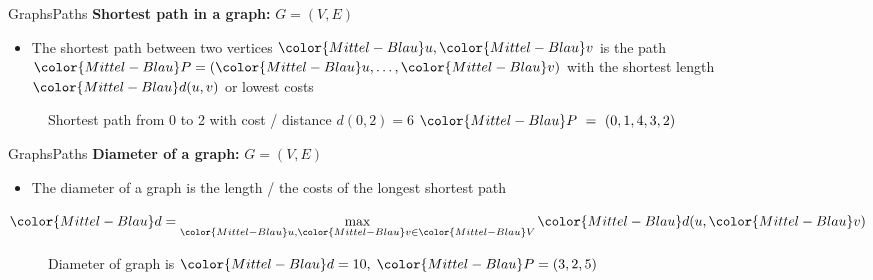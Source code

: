 \begin{frame}{Graphs}{Paths}
  \textbf{Shortest path in a graph:}
  {\color{Mittel-Blau}$G = (V , E)$}
  \begin{itemize}
    \item
      The {\color{Mittel-Blau}shortest path} between two vertices
      ${\color{Mittel-Blau}u}, {\color{Mittel-Blau}v}$ is the path
      \begin{math}
        {\color{Mittel-Blau}P}
          = ({\color{Mittel-Blau}u}, \dots, {\color{Mittel-Blau}v})
      \end{math}
      with the shortest length ${\color{Mittel-Blau}d(u,v)}$ or lowest costs
  \end{itemize}
  \begin{figure}
    \begin{adjustbox}{width=0.75\linewidth}
      
    \end{adjustbox}
    \caption{{\color{Mittel-Blau}Shortest path} from 0 to 2 with cost / distance
      {\color{Mittel-Blau}$d(0,2) = 6$}
      ${\color{Mittel-Blau}P}~=~(0, 1, 4, 3, 2)$}
    \label{fig:graphs:shortest_path}
  \end{figure}
\end{frame}


\begin{frame}{Graphs}{Paths}
  \textbf{Diameter of a graph:}
  {\color{Mittel-Blau}$G = (V , E)$}
  \begin{itemize}
    \item
      The {\color{Mittel-Blau}diameter} of a graph is the length / the costs of
      the {\color{Mittel-Blau}longest shortest path}
  \end{itemize}
  \vspace{-0.5em}
  \hfill\begin{math}
    \displaystyle
    {\color{Mittel-Blau}d} =
      \max\limits_{{\color{Mittel-Blau}u}, {\color{Mittel-Blau}v}
        \in {\color{Mittel-Blau}V}}
      {\color{Mittel-Blau}d(u, \color{Mittel-Blau}v)}
  \end{math}
  \begin{figure}
    \begin{adjustbox}{width=0.75\linewidth}
      
    \end{adjustbox}
    \caption{{\color{Mittel-Blau}Diameter} of graph is
      ${\color{Mittel-Blau}d} = 10, \; {\color{Mittel-Blau}P} = (3,2,5)$}
    \label{fig:graphs:diameter}
  \end{figure}
\end{frame}

